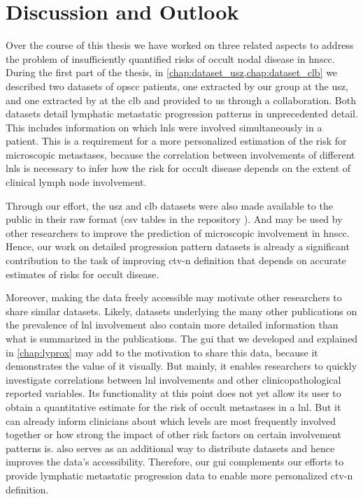 \documentclass[\relativeRoot/main.tex]{subfiles}
\begin{document}
\chapter{Discussion and Outlook}
\label{chap:discussion}
\globalreset

Over the course of this thesis we have worked on three related aspects to address the problem of insufficiently quantified risks of occult nodal disease in \gls{hnscc}. During the first part of the thesis, in \cref{chap:dataset_usz,chap:dataset_clb} we described two datasets of \gls{opscc} patients, one extracted by our group at the \gls{usz}, and one extracted by  at the \gls{clb} and provided to us through a collaboration. Both datasets detail lymphatic metastatic progression patterns in unprecedented detail. This includes information on which \glspl{lnl} were involved simultaneously in a patient. This is a requirement for a more personalized estimation of the risk for microscopic metastases, because the correlation between involvements of different \glspl{lnl} is necessary to infer how the risk for occult disease depends on the extent of clinical lymph node involvement.

Through our effort, the \gls{usz} and \gls{clb} datasets were also made available to the public in their raw format (\acrshort{csv} tables in the repository ). And may be used by other researchers to improve the prediction of microscopic involvement in \gls{hnscc}. Hence, our work on detailed progression pattern datasets is already a significant contribution to the task of improving \gls{ctv-n} definition that depends on accurate estimates of risks for occult disease.

Moreover, making the data freely accessible may motivate other researchers to share similar datasets. Likely, datasets underlying the many other publications on the prevalence of \gls{lnl} involvement \cite{candela_patterns_1990,shah_patterns_1990,woolgar_histological_1999,woolgar_topography_2007,chao_determination_2002,vauterin_patterns_2006,razfar_incidence_2009,ho_patterns_2012,bauwens_prevalence_2021} also contain more detailed information than what is summarized in the publications. The \gls{gui} \inlinelyproxlogo{} that we developed and explained in \cref{chap:lyprox} may add to the motivation to share this data, because it demonstrates the value of it visually. But mainly, it enables researchers to quickly investigate correlations between \gls{lnl} involvements and other clinicopathological reported variables. Its functionality at this point does not yet allow its user to obtain a quantitative estimate for the risk of occult metastases in a \gls{lnl}. But it can already inform clinicians about which levels are most frequently involved together or how strong the impact of other risk factors on certain involvement patterns is. \inlinelyproxlogo{} also serves as an additional way to distribute datasets and hence improves the data's accessibility. Therefore, our \gls{gui} complements our efforts to provide lymphatic metastatic progression data to enable more personalized \gls{ctv-n} definition.
\end{document}
